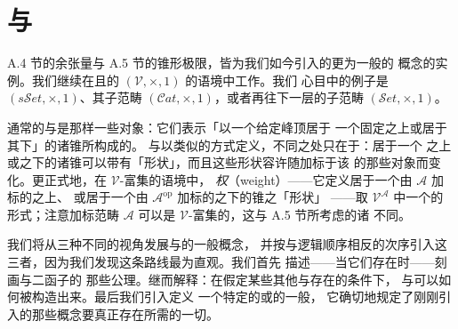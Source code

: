 
\providecommand{\Cat}{\mathcal{C}at}
\providecommand{\sSet}{s\mathcal{S}et}
\providecommand{\wlim}{\operatorname{lim}}
\providecommand{\wcolim}{\operatorname{colim}}
\providecommand{\lan}{\operatorname{lan}}
\providecommand{\ran}{\operatorname{ran}}
\providecommand{\Fun}{\operatorname{Fun}}
\providecommand{\qcor}[1]{\ulcorner#1\urcorner}   %

\section{\trWeightedLimit{}与\trWeightedColimit}\label{sec:weighted-limits-and-colimits}

A.4 节的余张量与 A.5 节的锥形极限，皆为我们如今引入的更为一般的%
\emph{\trWeightedLimit}概念的实例。我们继续在\trComplete{}且\trCocomplete{}的%
\trCartesianClosed{}\trCategory{} $(\mathcal{V},\times,1)$ 的语境中工作。我们
心目中的例子是 $(\sSet,\times,1)$、其\trCartesianClosed{}子范畴
$(\Cat,\times,1)$，或者再往下一层的\trCartesianClosed{}子范畴
$(\mathcal{S}et,\times,1)$。

通常的\trLimit{}与\trColimit{}是那样一些对象：它们表示「以一个给定峰顶居于
一个固定\trDiagram{}之上或居于其下」的诸锥所构成的\trFunctor。\trWeightedLimit%
{}与\trWeightedColimit{}以类似的方式定义，不同之处只在于：居于一个\trDiagram%
{}之上或之下的诸锥可以带有\trExotic{}「形状」，而且这些形状容许随加标于该%
\trDiagram{}的那些对象而变化。更正式地，在 $\mathcal{V}$-富集的语境中，%
\emph{权}（weight）——它定义居于一个由 $\mathcal{A}$ 加标的\trDiagram{}之上、
或居于一个由 $\mathcal{A}^{\mathrm{op}}$ 加标的\trDiagram{}之下的锥之「形状」
——取 $\mathcal{V}^{\mathcal{A}}$ 中一个\trFunctor{}的形式；注意加标范畴
$\mathcal{A}$ 可以是 $\mathcal{V}$-富集的，这与 A.5 节所考虑的诸\trDiagram%
{}不同。

我们将从三种不同的视角发展\trWeightedLimit{}与\trWeightedColimit{}的一般概念，
并按与逻辑顺序相反的次序引入这三者，因为我们发现这条路线最为直观。我们首先
描述——当它们存在时——刻画\trWeightedLimit{}与\trWeightedColimit{}二函子的
那些公理。继而解释：在假定某些其他\trLimit{}与\trColimit{}存在的条件下，
\trWeightedLimit{}与\trWeightedColimit{}可以如何被构造出来。最后我们引入定义
一个特定的\trWeightedLimit{}或\trWeightedColimit{}的一般\trUniversalProperty，
它确切地规定了刚刚引入的那些概念要真正存在所需的一切。


